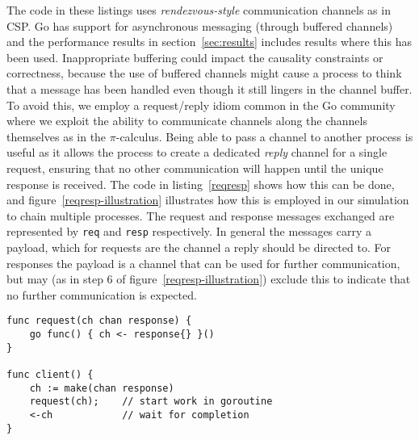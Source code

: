 The code in these listings uses \emph{rendezvous-style} communication channels
as in CSP. Go has support for asynchronous messaging (through buffered
channels) and the performance results in section~\ref{sec:results} includes
results where this has been used. Inappropriate buffering could impact the
causality constraints or correctness, because the use of buffered channels
might cause a process to think that a message has been handled even though it
still lingers in the channel buffer. To avoid this, we employ a request/reply
idiom common in the Go community where we exploit the ability to communicate
channels along the channels themselves as in the $\pi$-calculus. Being able to
pass a channel to another process is useful as it allows the process to create a
dedicated \emph{reply} channel for a single request, ensuring that no other
communication will happen until the unique response is received. The code in
listing~\ref{reqresp} shows how this can be done, and
figure~\ref{reqresp-illustration} illustrates how this is employed in our
simulation to chain multiple processes. The request and response messages
exchanged are represented by \lstinline{req} and \lstinline{resp} respectively.
In general the messages carry a payload, which for requests are the channel a
reply should be directed to. For responses the payload is a channel that can be
used for further communication, but may (as in step 6 of
figure~\ref{reqresp-illustration}) exclude this to indicate that no further
communication is expected.


\begin{lstlisting}[caption={Request/response using Go channels},label={reqresp}]
func request(ch chan response) {
    go func() { ch <- response{} }()
}

func client() {
    ch := make(chan response)
    request(ch);    // start work in goroutine
    <-ch            // wait for completion
}
\end{lstlisting}

